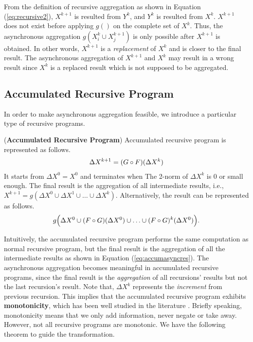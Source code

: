 \documentclass{vldb}
\begin{document}
From the definition of recursive aggregation as shown in Equation (\ref{eq:recursive2}), $X^{k+1}$ is resulted from $Y^k$, and $Y^k$ is resulted from $X^k$. $X^{k+1}$ does not exist before applying $g()$ on the complete set of $X^k$. Thus, the asynchronous aggregation $g(X_i^k\cup X_j^{k+1})$ is only possible after $X^{k+1}$ is obtained. In other words, $X^{k+1}$ is a \emph{replacement} of $X^k$ and is closer to the final result. The asynchronous aggregation of $X^{k+1}$ and $X^k$ may result in a wrong result since $X^k$ is a replaced result which is not supposed to be aggregated.

\subsection{Accumulated Recursive Program}
\label{sec:async:accrec}

In order to make asynchronous aggregation feasible, we introduce a particular type of recursive programs.

\begin{definition}
	\label{def:accumasync}
	(\textbf{Accumulated Recursive Program}) Accumulated recursive program is represented as follows.
	\begin{equation}\label{eq:accumasync}
	\begin{aligned}
	\Delta X^{k+1}=(G\circ F)(\Delta X^k)\notag
	\end{aligned}
	\end{equation}
	It starts from $\Delta X^0=X^0$ and terminates when The 2-norm of $\Delta X^k$ is 0 or small enough. The final result is the aggregation of all intermediate results, i.e., $X^{k+1}=g(\Delta X^{0} \cup \Delta X^{1} \cup \ldots \cup \Delta X^{k})$. Alternatively, the result can be represented as follows.
	\begin{equation}
	\label{eq:accumasyncres}
	g\Big(\Delta X^0\cup (F\circ G)(\Delta X^0)\cup\ldots\cup (F\circ G)^k(\Delta X^0)\Big).\notag
	\end{equation}
\end{definition}

Intuitively, the accumulated recursive program performs the same computation as normal recursive program, but the final result is the aggregation of all the intermediate results as shown in Equation (\ref{eq:accumasyncres}). The asynchronous aggregation becomes meaningful in accumulated recursive programs, since the final result is the \emph{aggregation} of all recursions' results but not the last recursion's result. Note that, $\Delta X^{k}$ represents the \emph{increment} from previous recursion. This implies that the accumulated recursive program exhibits \textbf{monotonicity}, which has been well studied in the literature \cite{Hellerstein:2010:DIE:1860702.1860704,calm,Lam:2013:SDE:2510649.2511289,Wang:2015:AFR:2824032.2824052}. Briefly speaking, monotonicity means that we only add information, never negate or take away. However, not all recursive programs are monotonic. We have the following theorem to guide the transformation.
\end{document}
